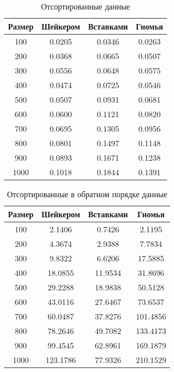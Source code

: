 \begin{table}[h]
	\begin{center}
		\begin{threeparttable}
		\captionsetup{justification=raggedleft,singlelinecheck=off}
		\caption{Отсортированные данные}
		\label{tbl:best}
		\begin{tabular}{|c|c|c|c|}
			\hline
			Размер & Шейкером &  Вставками &  Гномья \\
			\hline
			100 & 0.0205 & 0.0346 & 0.0263 \\ 
			\hline
			200 & 0.0368 & 0.0665 & 0.0507 \\ 
			\hline
			300 & 0.0556 & 0.0648 & 0.0575 \\ 
			\hline
			400 & 0.0474 & 0.0725 & 0.0546 \\ 
			\hline
			500 & 0.0507 & 0.0931 & 0.0681 \\ 
			\hline
			600 & 0.0600 & 0.1121 & 0.0820 \\ 
			\hline
			700 & 0.0695 & 0.1305 & 0.0956 \\ 
			\hline
			800 & 0.0801 & 0.1497 & 0.1148 \\ 
			\hline
			900 & 0.0893 & 0.1671 & 0.1238 \\ 
			\hline
			1000 & 0.1018 & 0.1844 & 0.1391 \\ 
			\hline
		\end{tabular}
		\end{threeparttable}
    \end{center}
\end{table}


\begin{table}[h]
	\begin{center}
		\begin{threeparttable}
		\captionsetup{justification=raggedleft,singlelinecheck=off}
		\caption{Отсортированные в обратном порядке данные}
		\label{tbl:worth}
		\begin{tabular}{|c|c|c|c|}
			\hline
			 Размер & Шейкером &  Вставками &  Гномья \\
			\hline
			100 & 2.1406 & 0.7426 & 2.1195 \\ 
			\hline
			200 & 4.3674 & 2.9388 & 7.7834 \\ 
			\hline
			300 & 9.8322 & 6.6206 & 17.5885 \\ 
			\hline
			400 & 18.0855 & 11.9534 & 31.8696 \\ 
			\hline
			500 & 29.2288 & 18.9838 & 50.5128 \\ 
			\hline
			600 & 43.0116 & 27.6467 & 73.6537 \\ 
			\hline
			700 & 60.0487 & 37.8276 & 101.4856 \\ 
			\hline
			800 & 78.2646 & 49.7082 & 133.4173 \\ 
			\hline
			900 & 99.4545 & 62.8961 & 169.1879 \\ 
			\hline
			1000 & 123.1786 & 77.9326 & 210.1529 \\ 
			\hline
		\end{tabular}
		\end{threeparttable}
    \end{center}
\end{table}


